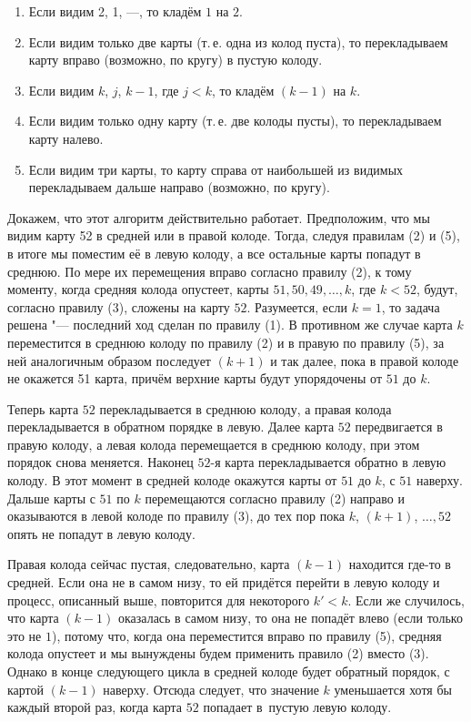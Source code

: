 \documentclass[twoside]{book}
\begin{document}
\begin{enumerate}[label=(\arabic*),noitemsep,leftmargin=\parindent,labelsep=3.5pt]
\item Если видим 2, 1, ---, то кладём $1$ на $2$.
\item Если видим только две карты (т.\,е. одна из колод пуста), то перекладываем карту вправо (возможно, по кругу) в пустую колоду.
\item Если видим $k$, $j$, $k-1$, где $j < k$, то кладём $(k-1)$ на $k$.
\item Если видим только одну карту (т.\,е. две колоды пусты), то перекладываем карту налево.
\item Если видим три карты, то карту справа от наибольшей из видимых перекладываем дальше направо (возможно, по кругу).
\end{enumerate}

Докажем, что этот алгоритм действительно работает.
Предположим, что мы видим карту 52 в средней или в правой колоде.
Тогда, следуя правилам (2) и (5), в итоге мы поместим её  в левую колоду, а все остальные карты попадут в среднюю.
По мере их перемещения вправо согласно правилу (2), к тому моменту, когда средняя колода опустеет, карты $51, 50, 49,
\dots, k$, где $k < 52$, будут, согласно правилу (3), сложены на карту $52$.
Разумеется, если $k = 1$, то задача решена "--- последний ход сделан по правилу (1).
В противном же случае карта $k$ переместится в среднюю колоду по правилу (2) и в правую по правилу (5), за ней аналогичным образом последует $(k+1)$ и так далее, пока в правой колоде не окажется 51 карта, причём верхние карты будут упорядочены от $51$ до $k$.

Теперь карта $52$ перекладывается в среднюю колоду,
а правая колода перекладывается в обратном порядке в левую.
Далее карта $52$ передвигается в правую колоду, а левая колода перемещается в среднюю колоду, при этом порядок снова меняется.
Наконец $52$-я карта перекладывается обратно в левую колоду.
В этот момент в средней колоде окажутся карты от $51$ до $k$, с $51$ наверху.
Дальше карты с $51$ по $k$ перемещаются согласно правилу (2) направо и оказываются в левой колоде по правилу (3), до тех пор пока $k$, $(k+1)$, $\dots, 52$ опять не попадут в левую колоду.

Правая колода сейчас пустая, следовательно,  карта $(k-1)$ находится где-то в средней.
Если она не в самом низу, то ей придётся перейти в левую колоду и процесс, описанный выше, повторится для некоторого $k'<k$.
Если же случилось, что карта $(k-1)$ оказалась в самом низу, то она не попадёт влево (если только это не $1$), потому что, когда она переместится вправо по правилу (5), средняя колода опустеет и мы вынуждены будем применить правило (2) вместо (3).
Однако в конце следующего цикла в средней колоде будет обратный порядок, с картой $(k-1)$ наверху.
Отсюда следует, что значение $k$ уменьшается хотя бы каждый второй раз, когда карта $52$ попадает в~пустую левую колоду.
\end{document}
